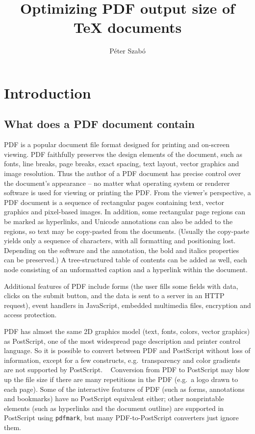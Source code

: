 \documentclass{ltugproc}
\title{Optimizing PDF output size of \TeX{} documents}
\author{P\'eter Szab\'o}
\begin{document}
\maketitle

\section{Introduction}


\subsection{What does a PDF document contain}

PDF is a popular document file format designed for printing and on-screen
viewing. PDF faithfully preserves the design elements of the document, such
as fonts, line breaks, page breaks, exact spacing, text layout, vector
graphics and image resolution. Thus the author of a PDF document has precise
control over the document's appearance -- no matter what operating system or
renderer software is used for viewing or printing the PDF. From the viewer's
perspective, a PDF document is a sequence of rectangular pages containing
text, vector graphics and pixel-based images. In addition, some
rectangular page regions can be marked as hyperlinks, and Unicode
annotations can also be added to the regions, so text may be copy-pasted
from the documents. (Usually the copy-paste yields only a sequence of
characters, with all formatting and positioning lost. Depending on the
software and the annotation, the bold and italics properties can be
preserved.) A tree-structured
table of contents can be added as well, each node consisting of
an unformatted caption and
a hyperlink within the document.

Additional features of PDF include forms (the user fills some fields with
data, clicks on the submit button, and the data is sent to a server in an
HTTP request), event handlers in JavaScript, embedded multimedia files,
encryption and access protection.

PDF has almost the same 2D graphics model (text, fonts, colors, vector
graphics) as PostScript, one of the most widespread page description and
printer control language. So it is possible to convert between PDF and
PostScript without loss of information, except for a few constructs,
e.g.\ transparency and color gradients are not supported by PostScript.%
\ %
Conversion from PDF to PostScript may blow up the file size if there are
many repetitions in the PDF (e.g.\ a logo drawn to each page). Some of the
interactive features of PDF (such as forms, annotations and bookmarks) have
no PostScript equivalent either; other nonprintable elements (such as
hyperlinks and the document outline) are supported in PostScript using
\texttt{pdfmark}, but many PDF-to-Post\-Script converters just ignore them.
\end{document}
